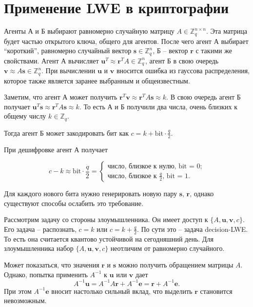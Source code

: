 \section{Применение LWE в криптографии}

Агенты А и Б выбирают равномерно случайную матрицу $A \in \mathds{Z}^{n \times n}_q$. Эта матрица будет частью открытого ключа, общего для агентов. После чего агент А выбирает ``короткий'', равномерно случайный вектор $\boldsymbol{s} \in \mathds{Z}^n_q$, Б -- вектор $\boldsymbol{r}$ с такими же свойствами. Агент А вычисляет $\bm{u}^T \approx \bm{r}^T A \in \mathds{Z}^n_q$, агент Б в свою очередь $\bm{v} \approx A \bm{s} \in \mathds{Z}^n_q$. При вычислении $\bm{u}$ и $\bm{v}$ вносится ошибка из гауссова распределения, которое также является заранее выбранным и общеизвестным.

Заметим, что агент А может получить $\bm{r}^T \bm{v} \approx \bm{r}^T A \bm{s} \approx k$. В свою очередь агент Б получает $\bm{u}^T \bm{s} \approx \bm{r}^T A \bm{s} \approx k$. То есть А и Б получили два числа, очень близких к общему числу $k \in \mathds{Z}_q$.

Тогда агент Б может закодировать бит как $c = k + \text{bit} \cdot \frac{q}{2}$.

При дешифровке агент А получает

\begin{equation*}
	c - k \approx \text{bit} \cdot \frac{q}{2} =
	\begin{cases}
		\text{число, близкое к нулю, bit = 0};\\
		\text{число, близкое к } \frac{q}{2} \text{, bit = 1}.
	\end{cases}
\end{equation*}

Для каждого нового бита нужно генерировать новую пару $\bm{s}$, $\bm{r}$, однако существуют способы ослабить это требование.

Рассмотрим задачу со стороны злоумышленника. Он имеет доступ к $\{A, \bm{u}, \bm{v}, c \}$. Его задача -- распознать, $c = k$ или $c = k + \frac{q}{2}$. По сути это -- задача decision-LWE. То есть она считается квантово устойчивой на сегодняшний день. Для злоумышленника набор $\{A, \bm{u}, \bm{v}, c \}$ неотличим от равномерно случайного.

Может показаться, что значения $\bm{r}$ и $\bm{s}$ можно получить обращением матрицы $A$. Однако, попытка применить $A^{-1}$ к $\bm{u}$ или $\bm{v}$ дает
\begin{equation*}
	A^{-1} \bm{u} = A^{-1} A \bm{r} + A^{-1} \bm{e}= \bm{r} + A^{-1} \bm{e}.
\end{equation*}
При этом $A^{-1} \bm{e}$ вносит настолько сильный вклад, что выделить $\bm{r}$ становится невозможным.

